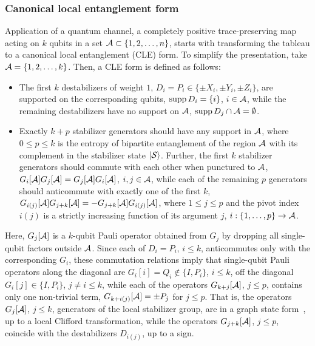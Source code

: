 \subsubsection{Canonical local entanglement form}
Application of a quantum channel, a completely positive
trace-preserving map acting on $k$ qubits in a set
${\cal A}\subset \{1,2,\ldots,n\}$, starts with transforming the
tableau to a canonical local entanglement (CLE)  form. To simplify
the presentation, take ${\cal A}=\{1,2,\ldots,k\}$.  Then, a CLE form is
defined as follows:
\begin{itemize}
\item The first $k$ destabilizers of weight $1$,
  $D_i=P_i\in \{\pm X_i,\pm Y_i,\pm Z_i\}$, are supported on the
  corresponding qubits, $\mathop{\rm supp} D_i=\{i\}$, $i\in {\cal A}$, while the
  remaining destabilizers have no support on ${\cal A}$,
  $\mathop{\rm supp} D_j \cap {\cal A}=\emptyset$.
\item Exactly $k+p$ stabilizer generators should have any support in
  ${\cal A}$, where $0\le p\le k$ is the entropy of bipartite
  entanglement\cite{Fattal-Cubitt-Yamamoto-Bravyi-Chuang-2004} of the
  region ${\cal A}$ with its complement in the stabilizer state
  $\ket{\cal S}$.  Further, the first $k$ stabilizer generators should
  commute with each other when punctured to ${\cal A}$,
  $G_i[{\cal A}]G_j[{\cal A}]=G_j[{\cal A}]G_i[{\cal A}]$,
  $ i,j\in {\cal A}$, while each of the remaining $p$ generators
  should anticommute with exactly one of the first $k$,
  $G_{i(j)}[{\cal A}]G_{j+k}[{\cal A}]=-G_{j+k}[{\cal
    A}]G_{i(j)}[{\cal A}]$, where $1\le j\le p$ and the pivot index
  $i(j)$ is a strictly increasing function of its argument $j$,
  $i: \{1,\ldots, p\}\to {\cal A}$.
\end{itemize}
Here, $G_j[{\cal A}]$ is a $k$-qubit Pauli operator obtained from $G_j$
by dropping all single-qubit factors outside ${\cal A}$.  Since each
of $D_i=P_i$, $i\le k$, anticommutes only with the corresponding
$G_i$, these commutation relations imply that single-qubit Pauli
operators along the diagonal are $G_i[i]= Q_i\not\in\{I,P_i\}$,
$i\le k$, off the diagonal $G_i[j]\in\{I,P_i\}$, $j\neq i\le k$, while each of the
operators $G_{k+j}[{\cal A}]$, $j\le p$, contains only one non-trivial
term, $G_{k+i(j)}[{\cal A}]=\pm P_j$ for $j\le p$.  That is, the
operators $G_j[{\cal A}]$, $j\le k$, generators of the local
stabilizer group, are in a graph state form~\cite{Hein-2006}, up to a
local Clifford transformation, while the operators
$G_{j+k}[{\cal A}]$, $j\le p$, coincide with the destabilizers
$D_{i(j)}$, up to a sign.

